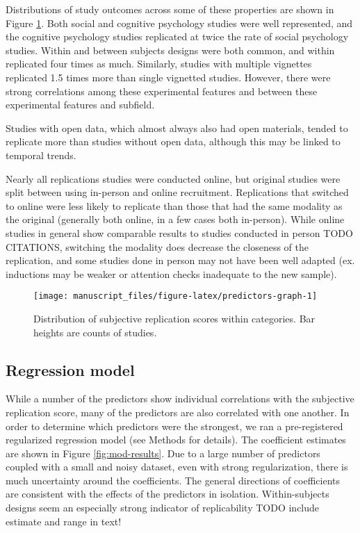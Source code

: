 \documentclass[
  english,
  a4paper,
]{article}
\begin{document}
Distributions of study outcomes across some of these properties are shown in Figure \ref{fig:predictors-graph}. Both social and cognitive psychology studies were well represented, and the cognitive psychology studies replicated at twice the rate of social psychology studies. Within and between subjects designs were both common, and within replicated four times as much. Similarly, studies with multiple vignettes replicated 1.5 times more than single vignetted studies. However, there were strong correlations among these experimental features and between these experimental features and subfield.

Studies with open data, which almost always also had open materials, tended to replicate more than studies without open data, although this may be linked to temporal trends.

Nearly all replications studies were conducted online, but original studies were split between using in-person and online recruitment. Replications that switched to online were less likely to replicate than those that had the same modality as the original (generally both online, in a few cases both in-person). While online studies in general show comparable results to studies conducted in person TODO CITATIONS, switching the modality does decrease the closeness of the replication, and some studies done in person may not have been well adapted (ex. inductions may be weaker or attention checks inadequate to the new sample).

\begin{figure}[ht]
\texttt{[image: manuscript\_files/figure-latex/predictors-graph-1]} \caption{Distribution of subjective replication scores within categories. Bar heights are counts of studies.}\label{fig:predictors-graph}
\end{figure}

\hypertarget{regression-model}{%
\subsection{Regression model}\label{regression-model}}

While a number of the predictors show individual correlations with the subjective replication score, many of the predictors are also correlated with one another. In order to determine which predictors were the strongest, we ran a pre-registered regularized regression model (see Methods for details). The coefficient estimates are shown in Figure \ref{fig:mod-results}. Due to a large number of predictors coupled with a small and noisy dataset, even with strong regularization, there is much uncertainty around the coefficients. The general directions of coefficients are consistent with the effects of the predictors in isolation. Within-subjects designs seem an especially strong indicator of replicability TODO include estimate and range in text!
\end{document}
